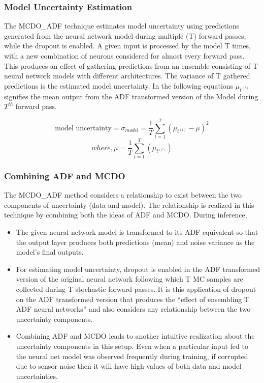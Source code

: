 	\subsubsection{Model Uncertainty Estimation}
	The MCDO\_ADF technique estimates model uncertainty using predictions generated from the neural network model during multiple (T) forward passes, while the dropout is enabled. A given input is processed by the model T times, with a new combination of neurons considered for almost every forward pass. This produces an effect of gathering predictions from an ensemble consisting of T neural network models with different architectures. The variance of T gathered predictions is the estimated model uncertainty. In the following equations $\mu_{t^{(l)}}$ signifies the mean output from the ADF transformed version of the Model during $T^{th}$ forward pass.
	
	\begin{equation}
		\text{model uncertainty} = \sigma_{model} =  \frac{1}{T}\sum_{t=1}^{T}(\mu_{t^{(l)}}-\overline{\mu})^2
	\end{equation}
	\begin{equation} 
		where, \overline{\mu} = \frac{1}{T}\sum_{t=1}^{T}(\mu_{t^{(l)}}) 
	\end{equation}
	\subsubsection{Combining ADF and MCDO}
	The MCDO\_ADF method considers a relationship to exist between the two components of uncertainty (data and model). The relationship  is realized in this technique by combining both the ideas of ADF and MCDO. During inference,  
	\begin{itemize}
		\item The given neural network model is transformed to its ADF equivalent so that the output layer produces both predictions (mean) and noise variance as the model's final outputs.
		\item For estimating model uncertainty,  dropout is enabled in the ADF transformed version of the original neural network following which T MC samples are collected during T stochastic forward passes. It is this application of dropout on the ADF transformed version that produces the \enquote{effect of ensembling T ADF neural networks} and also considers any relationship between the two uncertainty components.
		\item Combining ADF and MCDO leads to another intuitive realization about the uncertainty components in this setup. Even when a particular input fed to the neural net model was observed frequently during training, if corrupted due to sensor noise then it will have high values of both data and model uncertainties. 
		
	\end{itemize}
	
